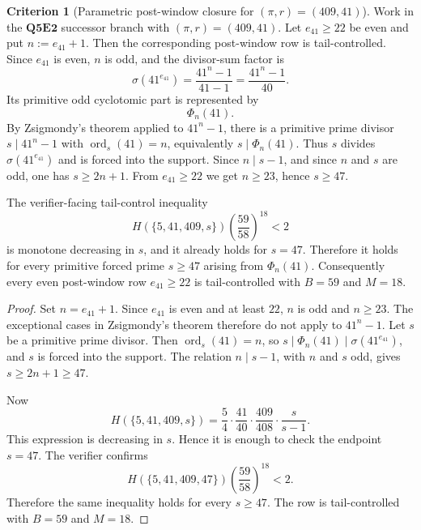 \documentclass[11pt]{article}
\theoremstyle{definition}
\newtheorem{criterion}[theorem]{Criterion}
\theoremstyle{remark}
\begin{document}
\begin{criterion}[Parametric post-window closure for \texorpdfstring{\((\pi,r)=(409,41)\)}{(pi,r)=(409,41)}]
\label{crit:q5e2-pi409-r41-parametric-post-window}
Work in the \(\mathbf{Q5E2}\) successor branch with \((\pi,r)=(409,41)\).
Let \(e_{41}\ge22\) be even and put \(n:=e_{41}+1\).  Then the corresponding
post-window row is tail-controlled.  Since \(e_{41}\) is even, \(n\) is odd,
and the divisor-sum factor is
\[
  \sigma(41^{e_{41}})
  =
  \frac{41^n-1}{41-1}
  =
  \frac{41^n-1}{40}.
\]
Its primitive odd cyclotomic part is represented by
\[
  \Phi_n(41).
\]
By Zsigmondy's theorem applied to \(41^n-1\), there is a primitive prime
divisor \(s\mid41^n-1\) with \(\operatorname{ord}_s(41)=n\), equivalently
\(s\mid\Phi_n(41)\).  Thus \(s\) divides \(\sigma(41^{e_{41}})\) and is forced
into the support.  Since \(n\mid s-1\), and since \(n\) and \(s\) are odd, one
has \(s\ge2n+1\).  From \(e_{41}\ge22\) we get \(n\ge23\), hence \(s\ge47\).

The verifier-facing tail-control inequality
\[
  H(\{5,41,409,s\})
  \left(\frac{59}{58}\right)^{18}<2
\]
is monotone decreasing in \(s\), and it already holds for \(s=47\).  Therefore
it holds for every primitive forced prime \(s\ge47\) arising from
\(\Phi_n(41)\).  Consequently every even post-window row \(e_{41}\ge22\) is
tail-controlled with \(B=59\) and \(M=18\).
\end{criterion}

\begin{proof}
Set \(n=e_{41}+1\).  Since \(e_{41}\) is even and at least \(22\), \(n\) is odd
and \(n\ge23\).  The exceptional cases in Zsigmondy's theorem therefore do not
apply to \(41^n-1\).  Let \(s\) be a primitive prime divisor.  Then
\(\operatorname{ord}_s(41)=n\), so
\(s\mid\Phi_n(41)\mid\sigma(41^{e_{41}})\), and \(s\) is forced into the
support.  The relation \(n\mid s-1\), with \(n\) and \(s\) odd, gives
\(s\ge2n+1\ge47\).

Now
\[
  H(\{5,41,409,s\})
  =
  \frac54\cdot\frac{41}{40}\cdot\frac{409}{408}\cdot\frac{s}{s-1}.
\]
This expression is decreasing in \(s\).  Hence it is enough to check the
endpoint \(s=47\).  The verifier confirms
\[
  H(\{5,41,409,47\})
  \left(\frac{59}{58}\right)^{18}<2.
\]
Therefore the same inequality holds for every \(s\ge47\).  The row is
tail-controlled with \(B=59\) and \(M=18\).
\end{proof}
\end{document}
